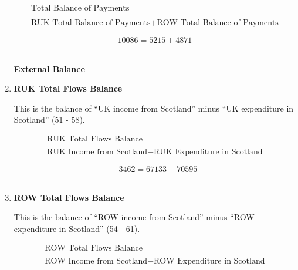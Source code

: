 \begin{enumerate}
\begin{equation}
\begin{split}
\text{Total Balance of Payments} =  \\ \\
\text{RUK Total Balance of Payments}+\text{ROW Total Balance of Payments}
\end{split} \label{eq:2.5.75}
\end{equation}

\begin{equation} \nonumber
10086 = 5215+4871
\end{equation}\\



\pagebreak

\begin{center}
\textbf{\LARGE External Balance}
\end{center}

\item \textbf {RUK Total Flows Balance}

This is the balance of “UK income from Scotland” minus “UK expenditure in Scotland” (51 - 58).

\begin{equation}
\begin{split}
\text{RUK Total Flows Balance} =  \\ \\
\text{RUK Income from Scotland}- \text{RUK Expenditure in Scotland}
\end{split} \label{eq:2.5.76}
\end{equation}

\begin{equation} \nonumber
-3462 = 67133-70595
\end{equation}\\


\item \textbf {ROW Total Flows Balance}

This is the balance of “ROW income from Scotland” minus “ROW expenditure in Scotland” (54 - 61).

\begin{equation}
\begin{split}
\text{ROW Total Flows Balance} =  \\ \\
\text{ROW Income from Scotland}- \text{ROW Expenditure in Scotland}
\end{split} \label{eq:2.5.77}
\end{equation}


\end{enumerate}
